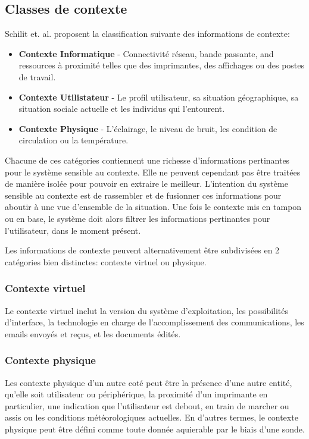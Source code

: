 \subsection{Classes de contexte}

Schilit et. al. proposent la classification suivante des informations de
contexte:

\begin{itemize}
  \item \textbf{Contexte Informatique} - Connectivité réseau, bande passante,
	  and ressources à proximité telles que des imprimantes, des
	  affichages ou des postes de travail.
  \item \textbf{Contexte Utilistateur} - Le profil utilisateur, sa situation
	  géographique, sa situation sociale actuelle et les individus qui
	  l'entourent.
  \item \textbf{Contexte Physique} - L'éclairage, le niveau de bruit, les
	  condition de circulation ou la température.
\end{itemize}

Chacune de ces catégories contiennent une richesse d'informations pertinantes
pour le système sensible au contexte. Elle ne peuvent cependant pas être
traitées de manière isolée pour pouvoir en extraire le meilleur. L'intention du
système sensible au contexte est de rassembler et de fusionner ces informations
pour aboutir à une vue d'ensemble de la situation. Une fois le contexte mis en
tampon ou en base, le système doit alors filtrer les informations pertinantes
pour l'utilisateur, dans le moment présent.

Les informations de contexte peuvent alternativement être subdivisées en 2
catégories bien distinctes: contexte virtuel ou physique.

\subsubsection{Contexte virtuel}

Le contexte virtuel inclut la version du système d'exploitation, les
possibilités d'interface, la technologie en charge de l'accomplissement des
communications, les emails envoyés et reçus, et les documents édités.

\subsubsection{Contexte physique}

Les contexte physique d'un autre coté peut être la présence d'une autre entité,
qu'elle soit utilisateur ou périphérique, la proximité d'un imprimante en
particulier, une indication que l'utilisateur est debout, en train de marcher ou
assis ou les conditions météorologiques actuelles. En d'autres termes, le
contexte physique peut être défini comme toute donnée aquierable par le biais
d'une sonde.

